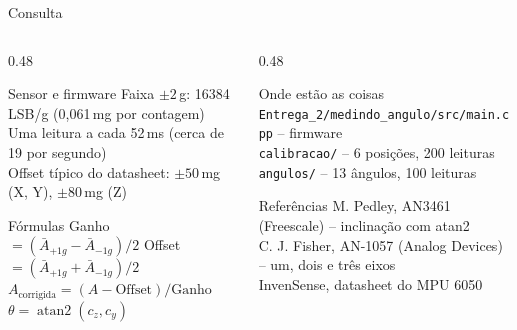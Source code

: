 \documentclass[aspectratio=169]{beamer}
\begin{document}
\begin{frame}{Consulta}
\begin{columns}[T]
\begin{column}{0.48\textwidth}
\begin{block}{Sensor e firmware}
\scriptsize
Faixa $\pm2$\,g: 16384\,LSB/g (0,061\,mg por contagem)\\
Uma leitura a cada 52\,ms (cerca de 19 por segundo)\\
Offset típico do datasheet: $\pm50$\,mg (X, Y), $\pm80$\,mg (Z)
\end{block}
\begin{block}{Fórmulas}
\scriptsize
Ganho $= (\bar{A}_{+1g}-\bar{A}_{-1g})/2$ \quad Offset $= (\bar{A}_{+1g}+\bar{A}_{-1g})/2$\\
$A_{\text{corrigida}} = (A - \text{Offset})/\text{Ganho}$\\
$\theta = \operatorname{atan2}(c_z, c_y)$
\end{block}
\end{column}
\begin{column}{0.48\textwidth}
\begin{block}{Onde estão as coisas}
\scriptsize
\texttt{Entrega\_2/medindo\_angulo/src/main.cpp} -- firmware\\
\texttt{calibracao/} -- 6 posições, 200 leituras\\
\texttt{angulos/} -- 13 ângulos, 100 leituras
\end{block}
\begin{block}{Referências}
\scriptsize
M. Pedley, AN3461 (Freescale) -- inclinação com atan2\\
C. J. Fisher, AN-1057 (Analog Devices) -- um, dois e três eixos\\
InvenSense, datasheet do MPU 6050
\end{block}
\end{column}
\end{columns}
\end{frame}
\end{document}
